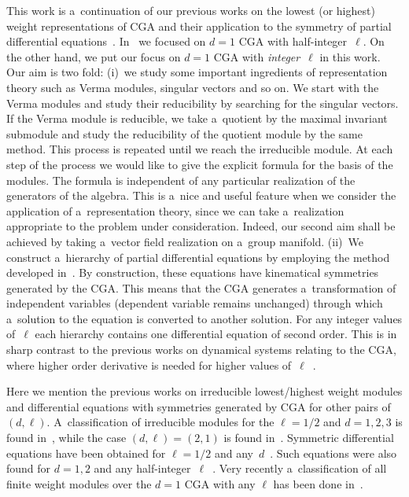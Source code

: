 \documentclass[pdftex]{sigma}
\numberwithin{equation}{section}
\begin{document}
This work is a~continuation of our previous works on the lowest (or highest) weight representations of CGA and their
application to the symmetry of partial dif\/ferential equations~\cite{AiIsKi,AiKimSeg}.
In~\cite{AiIsKi,AiKimSeg} we focused on $ d=1$ CGA with half-integer~$\ell$.
On the other hand, we put our focus on $d = 1$ CGA with \textit{integer}~$\ell$ in this work.
Our aim is two fold: (i)~we study some important ingredients of representation theory such as Verma modules, singular
vectors and so on.
We start with the Verma modules and study their reducibility by searching for the singular vectors.
If the Verma module is reducible, we take a~quotient by the maximal invariant submodule and study the reducibility of
the quotient module by the same method.
This process is repeated until we reach the irreducible module.
At each step of the process we would like to give the explicit formula for the basis of the modules.
The formula is independent of any particular realization of the generators of the algebra.
This is a~nice and useful feature when we consider the application of a~representation theory, since we can take
a~realization appropriate to the problem under consideration.
Indeed, our second aim shall be achieved by taking a~vector f\/ield realization on a~group manifold.
(ii)~We construct a~hierarchy of partial dif\/ferential equations by employing the method developed in~\cite{Dobrev}.
By construction, these equations have kinematical symmetries generated by the CGA.
This means that the CGA generates a~transformation of independent variables (dependent variable remains unchanged)
through which a~solution to the equation is converted to another solution.
For any integer values of~$\ell$ each hierarchy contains one dif\/ferential equation of second order.
This is in sharp contrast to the previous works on dynamical systems relating to the CGA, where higher order derivative
is needed for higher values of~$\ell$~\cite{AndGaGoMa,AndGo,AndGoKD,AndGoMas}.

Here we mention the previous works on irreducible lowest/highest weight modules and dif\/fe\-ren\-tial equations with
symmetries generated by CGA for other pairs of $(d,\ell)$.
A~classif\/ication of irreducible modules for the $ \ell = 1/2 $ and $ d = 1, 2, 3 $ is found in~\cite{DoDoMr, Mrugalla},
while the case $ (d,\ell) = (2,1) $ is found in~\cite{AiIs}.
Symmetric dif\/ferential equations have been obtained for $ \ell=1/2 $ and any~$d$~\cite{ADD,ADDS,DoDoMr, Mrugalla}.
Such equations were also found for $ d = 1, 2 $ and any half-integer~$\ell$~\cite{AiKimSeg}.
Very recently a~classif\/ication of all f\/inite weight modules over the $ d=1 $ CGA with any $ \ell $ has been done
in~\cite{LuMazoZhao}.
\end{document}
